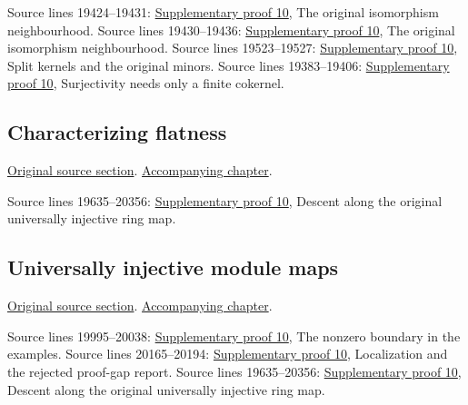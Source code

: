 \begin{AlgebraSourceRoutes}
 Source lines 19424--19431: \hyperlink{algebra_open_loci_pure_descent_notes_20260927}{Supplementary proof 10}, The original isomorphism neighbourhood.
 Source lines 19430--19436: \hyperlink{algebra_open_loci_pure_descent_notes_20260927}{Supplementary proof 10}, The original isomorphism neighbourhood.
 Source lines 19523--19527: \hyperlink{algebra_open_loci_pure_descent_notes_20260927}{Supplementary proof 10}, Split kernels and the original minors.
 Source lines 19383--19406: \hyperlink{algebra_open_loci_pure_descent_notes_20260927}{Supplementary proof 10}, Surjectivity needs only a finite cokernel.
\end{AlgebraSourceRoutes}

\subsection{Characterizing flatness}
\hypertarget{algebra-source-section-characterize-flatness}{}
\noindent\href{https://github.com/stacks/stacks-project/blob/a04446e57ec1fbc252a871afcec7752fb2807b14/algebra.tex\#L19583}{Original source section}. \href{algebra.pdf\#nameddest=section-characterize-flatness}{Accompanying chapter}.

\begin{AlgebraSourceRoutes}
 Source lines 19635--20356: \hyperlink{algebra_open_loci_pure_descent_notes_20260927}{Supplementary proof 10}, Descent along the original universally injective ring map.
\end{AlgebraSourceRoutes}

\subsection{Universally injective module maps}
\hypertarget{algebra-source-section-universally-injective}{}
\noindent\href{https://github.com/stacks/stacks-project/blob/a04446e57ec1fbc252a871afcec7752fb2807b14/algebra.tex\#L19742}{Original source section}. \href{algebra.pdf\#nameddest=section-universally-injective}{Accompanying chapter}.

\begin{AlgebraSourceRoutes}
 Source lines 19995--20038: \hyperlink{algebra_open_loci_pure_descent_notes_20260927}{Supplementary proof 10}, The nonzero boundary in the examples.
 Source lines 20165--20194: \hyperlink{algebra_open_loci_pure_descent_notes_20260927}{Supplementary proof 10}, Localization and the rejected proof-gap report.
 Source lines 19635--20356: \hyperlink{algebra_open_loci_pure_descent_notes_20260927}{Supplementary proof 10}, Descent along the original universally injective ring map.
\end{AlgebraSourceRoutes}

